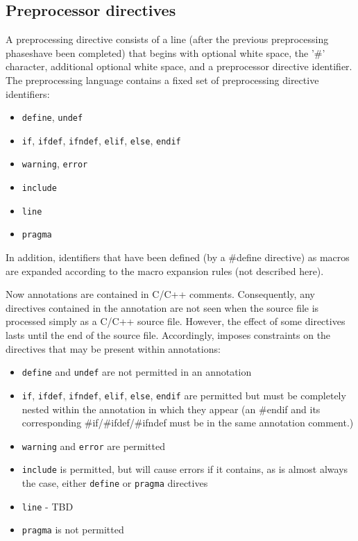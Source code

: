 \subsection{Preprocessor directives}
A preprocessing directive consists of a line (after the previous preprocessing phaseshave been completed) that begins with optional white space, the '\#' character, additional optional white space, and a preprocessor directive identifier.
The preprocessing language contains a fixed set of preprocessing directive identifiers:
\begin{itemize}
	\item \texttt{define}, \texttt{undef}
	\item \texttt{if}, \texttt{ifdef}, \texttt{ifndef}, \texttt{elif}, \texttt{else}, \texttt{endif}
	\item \texttt{warning}, \texttt{error}
	\item \texttt{include}
	\item \texttt{line}
	\item \texttt{pragma}
\end{itemize}
In addition, identifiers that have been defined (by a \#define directive) as macros are expanded according to the macro expansion rules (not described here).

Now \acslb annotations are contained in C/C++ comments. 
Consequently, any directives contained in the annotation are not seen when the source file is processed simply as a C/C++ source file. However, the effect of some directives lasts until the end of the source file. 
Accordingly, \NAME{} imposes constraints on the directives that may be present within annotations:
\begin{itemize}
	\item \texttt{define} and \texttt{undef} are not permitted in an annotation
	\item \texttt{if}, \texttt{ifdef}, \texttt{ifndef}, \texttt{elif}, \texttt{else}, \texttt{endif} are permitted but must be completely nested within the annotation in which they appear (an \#endif and its corresponding \#if/\#ifdef/\#ifndef must be in the same annotation comment.)
	\item \texttt{warning} and \texttt{error} are permitted
	\item \texttt{include} is permitted, but will cause errors if it contains, as is almost always the case, either \texttt{define} or \texttt{pragma} directives
	\item \texttt{line} - TBD
	\item \texttt{pragma} is not permitted
\end{itemize}




